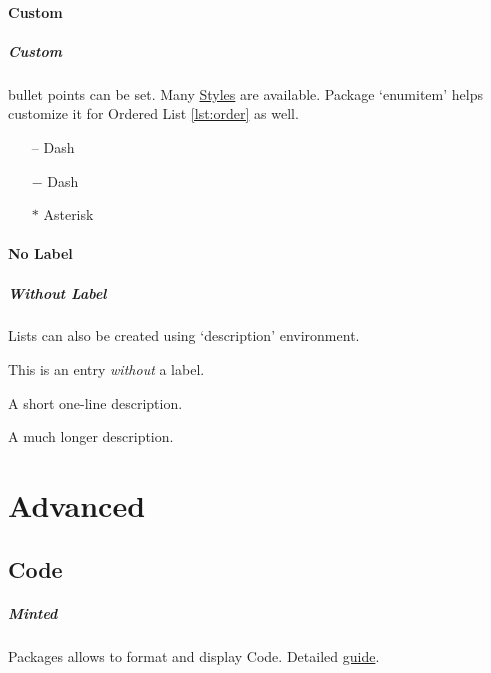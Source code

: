 \documentclass{report}[a4paper,12pt] %
\begin{document}
\subsubsection{Custom}
\paragraph{Custom} bullet points can be set. Many \href{https://latex-tutorial.com/bullet-styles/}{Styles} are available.
Package `enumitem' helps customize it for Ordered List \ref{lst:order} as well.
\begin{itemize}
  \label{lst:format}
  \item[--] Dash
  \item[$-$] Dash
  \item[$\ast$] Asterisk
\end{itemize}

\vspace{10pt}

\subsubsection{No Label}
\paragraph{Without Label} Lists can also be created using `description' environment.

\begin{description}
  \item This is an entry \textit{without} a label.
  \item[Something short] A short one-line description.
  \item[Something long] A much longer description. \lipsum[1]
\end{description}

\chapter{Advanced}
\section{Code}
\paragraph{Minted} Packages allows to format and display Code. Detailed \href{https://mirror.niser.ac.in/ctan/macros/latex/contrib/minted/minted.pdf}{guide}.
\end{document}
